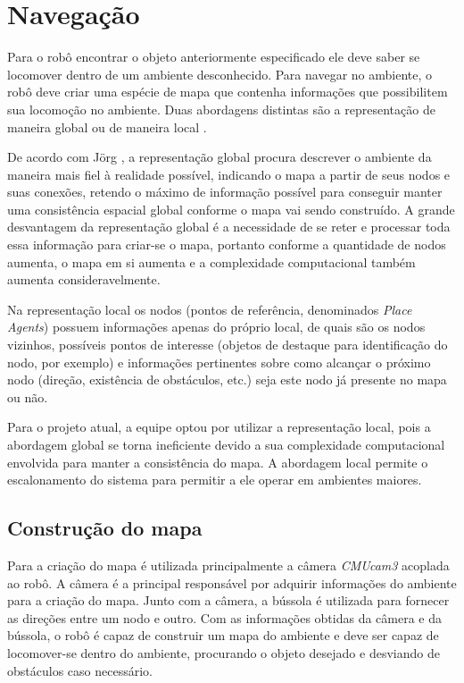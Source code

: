 \chapter{Navegação}

Para o robô encontrar o objeto anteriormente especificado ele deve saber se locomover dentro de um ambiente desconhecido. Para navegar no ambiente, o robô deve criar uma espécie de mapa que contenha informações que possibilitem sua locomoção no ambiente. Duas abordagens distintas são a representação de maneira global ou de maneira local \cite{conradt}.

De acordo com Jörg \cite{conradt}, a representação global procura descrever o ambiente da maneira mais fiel à realidade possível, indicando o mapa a partir de seus nodos e suas conexões, retendo o máximo de informação possível para conseguir manter uma consistência espacial global conforme o mapa vai sendo construído. A grande desvantagem da representação global é a necessidade de se reter e processar toda essa informação para criar-se o mapa, portanto conforme a quantidade de nodos aumenta, o mapa em si aumenta e a complexidade computacional também aumenta consideravelmente.

Na representação local os nodos (pontos de referência, denominados \textit{Place Agents}) possuem informações apenas do próprio local, de quais são os nodos vizinhos, possíveis pontos de interesse (objetos de destaque para identificação do nodo, por exemplo) e informações pertinentes sobre como alcançar o próximo nodo (direção, existência de obstáculos, etc.) seja este nodo já presente no mapa ou não.

Para o projeto atual, a equipe optou por utilizar a representação local, pois a abordagem global se torna ineficiente devido a sua complexidade computacional envolvida para manter a consistência do mapa. A abordagem local permite o escalonamento do sistema para permitir a ele operar em ambientes maiores.

\section{Construção do mapa}

Para a criação do mapa é utilizada principalmente a câmera \textit{CMUcam3} acoplada ao robô. A câmera é a principal responsável por adquirir informações do ambiente para a criação do mapa. Junto com a câmera, a bússola é utilizada para fornecer as direções entre um nodo e outro. Com as informações obtidas da câmera e da bússola, o robô é capaz de construir um mapa do ambiente e deve ser capaz de locomover-se dentro do ambiente, procurando o objeto desejado e desviando de obstáculos caso necessário.

